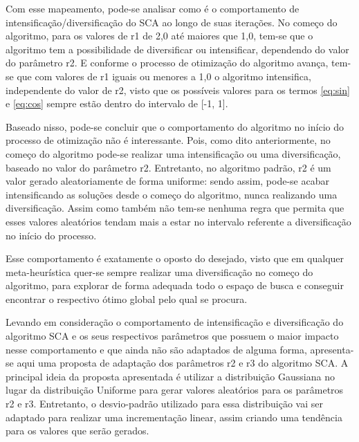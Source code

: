 
Com esse mapeamento, pode-se analisar como é o comportamento de intensificação/diversificação do SCA ao longo de suas iterações. No começo do algoritmo, para os valores de r1 de 2,0 até maiores que 1,0, tem-se que o algoritmo tem a possibilidade de diversificar ou intensificar, dependendo do valor do parâmetro r2. E conforme o processo de otimização do algoritmo avança, tem-se que com valores de r1 iguais ou menores a 1,0 o algoritmo intensifica, independente do valor de r2, visto que os possíveis valores para os termos \ref{eq:sin} e \ref{eq:cos} sempre estão dentro do intervalo de [-1, 1].

Baseado nisso, pode-se concluir que o comportamento do algoritmo no início do processo de otimização não é interessante. Pois, como dito anteriormente, no começo do algoritmo pode-se realizar uma intensificação ou uma diversificação, baseado no valor do parâmetro r2. Entretanto, no algoritmo padrão, r2 é um valor gerado aleatoriamente de forma uniforme: sendo assim, pode-se acabar intensificando as soluções desde o começo do algoritmo, nunca realizando uma diversificação. Assim como também não tem-se nenhuma regra que permita que esses valores aleatórios tendam mais a estar no intervalo referente a diversificação no início do processo.

Esse comportamento é exatamente o oposto do desejado, visto que em qualquer meta-heurística quer-se sempre realizar uma diversificação no começo do algoritmo, para explorar de forma adequada todo o espaço de busca e conseguir encontrar o respectivo ótimo global pelo qual se procura.

Levando em consideração o comportamento de intensificação e diversificação do algoritmo SCA e os seus respectivos parâmetros que possuem o maior impacto nesse comportamento e que ainda não são adaptados de alguma forma, apresenta-se aqui uma proposta de adaptação dos parâmetros r2 e r3 do algoritmo SCA. A principal ideia da proposta apresentada é utilizar a distribuição Gaussiana no lugar da distribuição Uniforme para gerar valores aleatórios para os parâmetros r2 e r3. Entretanto, o desvio-padrão utilizado para essa distribuição vai ser adaptado para realizar uma incrementação linear, assim criando uma tendência para os valores que serão gerados. 

